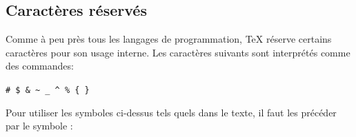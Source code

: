 \subsection{Caractères réservés}
\label{sec:bases:caracteres:reserves}

Comme à peu près tous les langages de programmation, {\TeX} réserve
certains caractères pour son usage interne. Les caractères suivants sont
interprétés comme des commandes:
\begin{center}
  \verb=# $ & ~ _ ^ % { }=
\end{center}

Pour utiliser les symboles ci-dessus tels quels dans le texte, il faut
les précéder par le symbole {\bs}:
\index{%
\begin{demo}
  \begin{minipage}{0.15\linewidth}
    \begin{texample}
\begin{lstlisting}
\#
\end{lstlisting}
      \producing\ \#
    \end{texample}
  \end{minipage}
  \hfill
  \begin{minipage}{0.15\linewidth}
    \begin{texample}
\begin{lstlisting}
\$
\end{lstlisting}
      \producing\ \$
    \end{texample}
  \end{minipage}
  \hfill
  \begin{minipage}{0.15\linewidth}
    \begin{texample}
\begin{lstlisting}
\&
\end{lstlisting}
      \producing\ \&
    \end{texample}
  \end{minipage}
  \hfill
  \begin{minipage}{0.15\linewidth}
    \begin{texample}
\begin{lstlisting}
\_
\end{lstlisting}
      \producing\rule{0pt}{1em}\ \_
    \end{texample}
  \end{minipage}
  \\
  \begin{minipage}{0.15\linewidth}

\end{minipage}
\end{demo}}
